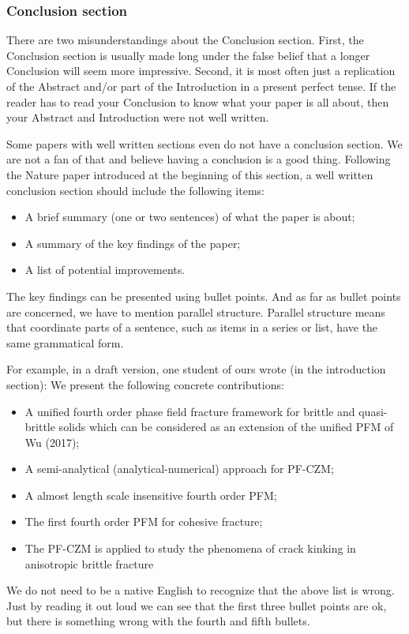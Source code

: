 \documentclass[authoryear,12pta4paper,fleqn]{article}
\numberwithin{equation}{section}
\theoremstyle{remark}
\begin{document}
\subsubsection{Conclusion section}\label{sec:conclusion-part}

There are two misunderstandings about the Conclusion section. First, the Conclusion section is usually made long under the false belief that a longer Conclusion will seem more impressive. Second, it is most often just a replication of the Abstract and/or part of the Introduction in a present perfect tense. If the reader has to read your Conclusion to know what your paper is all about, then your Abstract and Introduction were not well written.

Some papers with well written sections even do not have a conclusion section. We are not a fan of that and believe having a conclusion is a good thing. Following the Nature paper introduced at the beginning of this section, a well written conclusion section should include the following items:

\begin{itemize}
\item A brief summary (one or two sentences) of what the paper is about;
\item A summary of the key findings of the paper;
\item A list of potential improvements.
\end{itemize}
The key findings can be presented using bullet points. And as far as bullet points are concerned, we have to mention parallel structure. Parallel structure means that coordinate parts of a sentence, such as items in a series or list, have the same grammatical form. 

For example, in a draft version, one student of ours wrote (in the introduction section): We present the following concrete contributions:
\begin{itemize}
	\item A unified fourth order phase field fracture framework for brittle and quasi-brittle solids which can be considered as an extension of the unified PFM of Wu (2017);
	\item A semi-analytical (analytical-numerical) approach for PF-CZM;
\item A almost length scale insensitive fourth order PFM;
\item The first fourth order PFM for cohesive fracture;
\item The PF-CZM is applied to study the phenomena of crack kinking in anisotropic brittle fracture
\end{itemize}
We do not need to be a native English to recognize that the above list is wrong. Just by reading it out loud we can see that the first three bullet points are ok, but there is something wrong with the fourth and fifth bullets.
\end{document}
